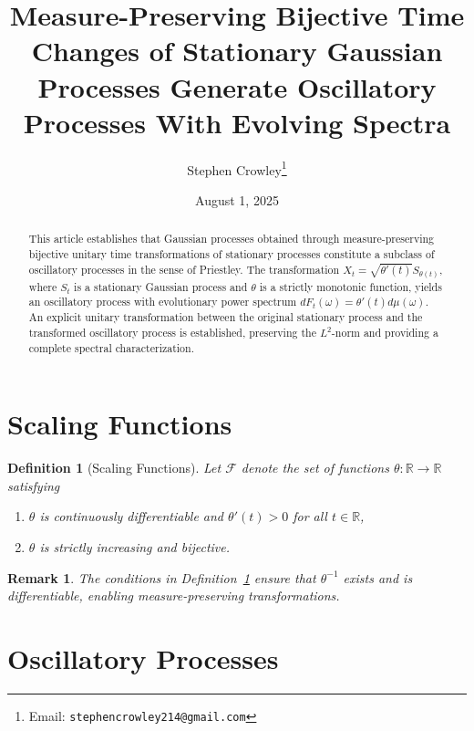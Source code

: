 \documentclass[11pt]{article}
\title{Measure-Preserving Bijective Time Changes of Stationary Gaussian Processes Generate Oscillatory Processes With Evolving Spectra}
\author{Stephen Crowley\thanks{Email: \texttt{stephencrowley214@gmail.com}}}
\date{August 1, 2025}
\newtheorem{definition}{Definition}
\newtheorem{remark}{Remark}
\begin{document}
\maketitle

\begin{abstract}
This article establishes that Gaussian processes obtained through measure-preserving bijective unitary time transformations of stationary processes constitute a subclass of oscillatory processes in the sense of Priestley. The transformation $X_t = \sqrt{\theta'(t)} S_{\theta(t)}$, where $S_t$ is a stationary Gaussian process and $\theta$ is a strictly monotonic function, yields an oscillatory process with evolutionary power spectrum $dF_t(\omega) = \theta'(t) d\mu(\omega)$. An explicit unitary transformation between the original stationary process and the transformed oscillatory process is established, preserving the $L^2$-norm and providing a complete spectral characterization.
\end{abstract}

\section{Scaling Functions}\label{sec:scaling}

\begin{definition}[Scaling Functions]\label{def:scaling}
Let $\mathcal{F}$ denote the set of functions $\theta\colon\mathbb{R}\to\mathbb{R}$ satisfying
\begin{enumerate}[label=(\alph*)]
    \item $\theta$ is continuously differentiable and $\theta'(t)>0$ for all $t\in\mathbb{R}$,
    \item $\theta$ is strictly increasing and bijective.
\end{enumerate}
\end{definition}

\begin{remark}
The conditions in Definition~\ref{def:scaling} ensure that $\theta^{-1}$ exists and is differentiable, enabling measure-preserving transformations.
\end{remark}

\section{Oscillatory Processes}\label{sec:oscillatory}
\end{document}
